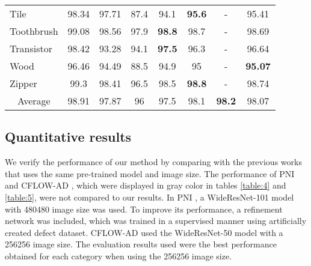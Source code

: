 \documentclass[10pt,onecolumn,letterpaper]{article}
\begin{document}
\begin{table*}[]
\begin{tabular}{l|c|ccccc|c}
Tile          & {\color{gray}98.34}          & {\color{gray}97.71}   & 87.4          & 94.1          & \textbf{95.6}   & -      & 95.41            \\
Toothbrush    & {\color{gray}99.08}          & {\color{gray}98.56}   & 97.9          & \textbf{98.8} & 98.7            & -      & 98.69            \\
Transistor    & {\color{gray}98.42}          & {\color{gray}93.28}   & 94.1          & \textbf{97.5} & 96.3            & -      & 96.64            \\
Wood          & {\color{gray}96.46}          & {\color{gray}94.49}   & 88.5          & 94.9          & 95              & -      & \textbf{95.07}   \\
Zipper        & {\color{gray}99.3}           & {\color{gray}98.41}   & 96.5          & 98.5          & \textbf{98.8}   & -      & 98.74            \\
\hline
\multicolumn{1}{c|}{Average} & {\color{gray}98.91}           & {\color{gray}97.87}  & 96 & 97.5 &  98.1   & \textbf{98.2}       & 98.07            \\
\hline
\end{tabular}
\caption{Anomaly segmentation performance (Pixel-level AUROC) of the MVTec AD \cite{bergmann2019mvtec} dataset. The {\color{gray}gray} color indicates the use of a different backbone or image size compared to previous studies.}
\label{table:5}
\end{table*}


\subsection{Quantitative results}
We verify the performance of our method by comparing with the previous works \cite{cohen2020sub, defard2021padim, lee2022cfa, roth2022towards} that uses the same pre-trained model and image size. The performance of PNI \cite{bae2022image} and CFLOW-AD \cite{gudovskiy2022cflow}, which were displayed in gray color in tables \ref{table:4} and \ref{table:5}, were not compared to our results. In PNI \cite{bae2022image}, a WideResNet-101 model with 480480 image size was used. To improve its performance, a refinement network was included, which was trained in a supervised manner using artificially created defect dataset. CFLOW-AD \cite{gudovskiy2022cflow} used the WideResNet-50 model with a 256256 image size. The evaluation results used were the best performance obtained for each category when using the 256256 image size. 
\end{document}
